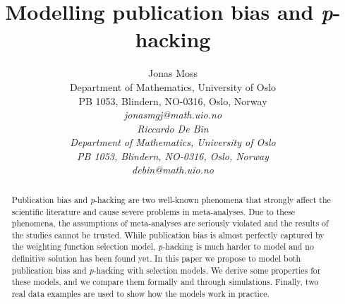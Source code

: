 \documentclass{article}
\title{Modelling publication bias and \textit{p}-hacking}
\author{
  Jonas Moss \\
  Department of Mathematics, University of Oslo\\
  PB 1053, Blindern, NO-0316, Oslo, Norway \\
  \it{jonasmgj@math.uio.no} \\ 
     \And
  Riccardo De Bin \\
  Department of Mathematics, University of Oslo\\
  PB 1053, Blindern, NO-0316, Oslo, Norway \\
  \it{debin@math.uio.no} \\ 
}
\theoremstyle{plain}
\theoremstyle{definition}
\begin{document}
\maketitle
\begin{abstract}
Publication bias and \textit{p}-hacking are two well-known phenomena that strongly affect the scientific literature and cause severe problems in meta-analyses. Due to these phenomena, the assumptions of meta-analyses are seriously violated and the results of the studies cannot be trusted. While publication bias is almost perfectly captured by the weighting function selection model, \textit{p}-hacking is much harder to model and no definitive solution has been found yet. In this paper we propose to model both publication bias and \textit{p}-hacking with selection models. We derive some properties for these models, and we compare them formally and through simulations. Finally, two real data examples are used to show how the models work in practice.
\end{abstract}








\end{document}
